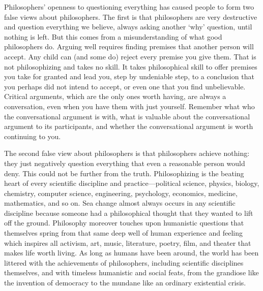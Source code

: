 \documentclass[oneside,letterpaper,12pt]{book}
\begin{document}
Philosophers' openness to questioning everything has caused people to form two false views about philosophers. The first is that philosophers are very destructive and question everything we believe, always asking another `why' question, until nothing is left. But this comes from a misunderstanding of what good philosophers do. Arguing well requires finding premises that another person will accept. Any child can (and some do) reject every premise you give them. That is not philosophizing and takes no skill. It takes philosophical skill to offer premises you take for granted and lead you, step by undeniable step, to a conclusion that you perhaps did not intend to accept, or even one that you find unbelievable. Critical arguments, which are the only ones worth having, are always a conversation, even when you have them with just yourself. Remember what who the conversational argument is with, what is valuable about the conversational argument to its participants, and whether the conversational argument is worth continuing to you.

The second false view about philosophers is that philosophers achieve nothing: they just negatively question everything that even a reasonable person would deny. This could not be further from the truth. Philosophizing is the beating heart of every scientific discipline and practice---political science, physics, biology, chemistry, computer science, engineering, psychology, economics, medicine, mathematics, and so on. Sea change almost always occurs in any scientific discipline because someone had a philosophical thought that they wanted to lift off the ground. Philosophy moreover touches upon humanistic questions that themselves spring from that same deep well of human experience and feeling which inspires all activism, art, music, literature, poetry, film, and theater that makes life worth living. As long as humans have been around, the world has been littered with the achievements of philosophers, including scientific disciplines themselves, and with timeless humanistic and social feats, from the grandiose like the invention of democracy to the mundane like an ordinary existential crisis. 
\end{document}
